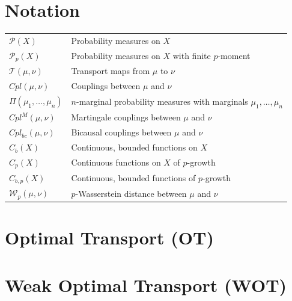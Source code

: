 \documentclass[a4paper,12pt]{article}
\begin{document}
\newpage
\section*{Notation}

\begin{tabular}{ll}
$\mathcal{P}(X)$ &  Probability measures on $X$ \\
\vspace{3pt}
$\mathcal{P}_p(X)$ &  Probability measures on $X$ with finite $p$-moment \\
\vspace{3pt}
$\mathcal{T}(\mu, \nu)$  &  Transport maps from $\mu$ to $\nu$ \\
\vspace{3pt}
$Cpl(\mu, \nu)$  &  Couplings between $\mu$ and $\nu$ \\
\vspace{3pt}
$\Pi(\mu_1, \dots, \mu_n)$ &  $n$-marginal probability measures with marginals $\mu_1, \dots, \mu_n$ \\
\vspace{3pt}
$Cpl^M(\mu, \nu)$  &  Martingale couplings between $\mu$ and $\nu$ \\
\vspace{3pt}
$Cpl_{bc}(\mu, \nu)$  &  Bicausal couplings between $\mu$ and $\nu$ \\
\vspace{3pt}
$C_b(X)$  &  Continuous, bounded functions on $X$ \\
\vspace{3pt}
$C_p(X)$  &  Continuous functions on $X$ of $p$-growth\\
\vspace{3pt}
$C_{b,p}(X)$ &  Continuous, bounded functions of $p$-growth \\
\vspace{3pt}
$\mathcal{W}_p(\mu, \nu)$  &  $p$-Wasserstein distance between $\mu$ and $\nu$ \\
\end{tabular}

\newpage
{}
\setcounter{page}{1}
\section{Optimal Transport (OT)}


\newpage
\section{Weak Optimal Transport (WOT)}


\newpage
{}
\printbibliography
\end{document}
